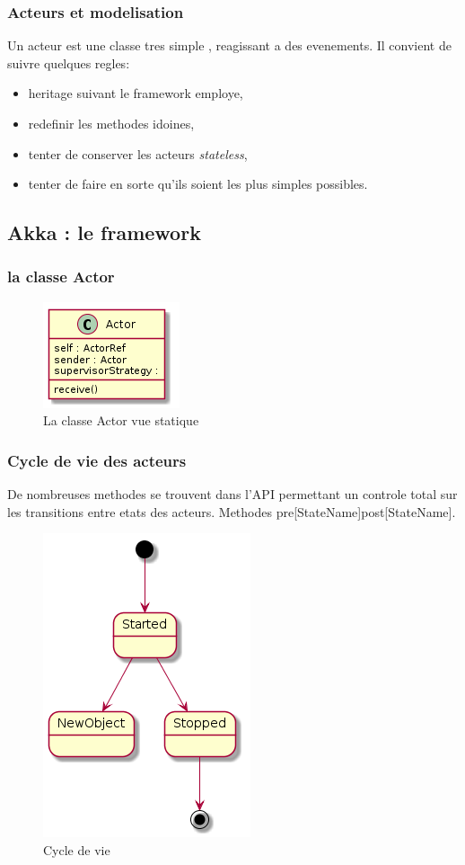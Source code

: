 \documentclass[xcolor=dvipsnames]{beamer}
\begin{document}
\begin{frame}
  \frametitle{Acteurs et modelisation}
  Un acteur est une classe tres simple , reagissant a des evenements. Il convient de suivre quelques regles:
  \begin{itemize}
   \item heritage suivant le framework employe,
   \item redefinir les methodes idoines,
   \item  tenter de conserver les acteurs \textit{stateless},
   \item  tenter de faire en sorte qu'ils soient les plus simples possibles.
  \end{itemize}
\end{frame}
\subsection{Akka : le framework}
\begin{frame}[fragile]
  \frametitle{la classe Actor}
   \begin{figure}[h!]
  \caption{La classe Actor vue statique}
  \centering
      \includegraphics[scale=0.5]{akka-actor-class}
  \end{figure}
\end{frame}

\begin{frame}[fragile]
  \frametitle{Cycle de vie des acteurs}
    De nombreuses methodes se trouvent dans l'API permettant
   un controle total sur les transitions entre etats des acteurs.
   Methodes pre[StateName]\/post[StateName].
    \begin{figure}[h!]
  \caption{Cycle de vie}
  \centering
      \includegraphics[scale=0.5]{akka-lifecycle.png}
  \end{figure}
\end{frame}
\end{document}
